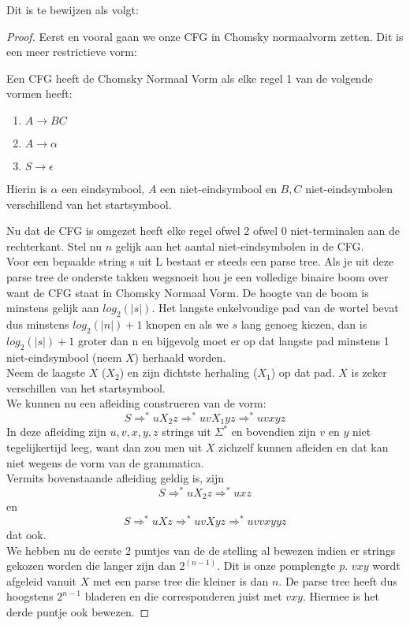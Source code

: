 Dit is te bewijzen als volgt:
\begin{proof}
Eerst en vooral gaan we onze CFG in Chomsky normaalvorm zetten. Dit is een meer restrictieve vorm:
\begin{theorem}
Een CFG heeft de Chomsky Normaal Vorm als elke regel 1 van de volgende vormen heeft:
\begin{enumerate}
\item $A \rightarrow BC$
\item $A \rightarrow \alpha$
\item $S \rightarrow \epsilon$
\end{enumerate}
Hierin is $\alpha$ een eindsymbool, $A$ een niet-eindsymbool en $B,C$ niet-eindsymbolen verschillend van het startsymbool.
\end{theorem}
Nu dat de CFG is omgezet heeft elke regel ofwel 2 ofwel 0 niet-terminalen aan de rechterkant. Stel nu $n$ gelijk aan het aantal niet-eindsymbolen in de CFG.\\[0.5cm]

Voor een bepaalde string s uit L bestaat er steeds een parse tree. Als je uit deze parse tree de onderste takken wegsnoeit hou je een volledige binaire boom over want de CFG staat in Chomsky Normaal Vorm. De hoogte van de boom is minstens gelijk aan $log_2(|s|)$. Het langste enkelvoudige pad van de wortel bevat dus minstens $log_2(|n|)+1$ knopen en als we $s$ lang genoeg kiezen, dan is $log_2(|s|)+1$ groter dan n en bijgevolg moet er op dat langste pad minstens 1 niet-eindsymbool (neem $X$) herhaald worden.\\[0.5cm]

Neem de laagste $X$ ($X_2$) en zijn dichtste herhaling ($X_1$) op dat pad. $X$ is zeker verschillen van het startsymbool.\\
We kunnen nu een afleiding construeren van de vorm:
$$ S \Rightarrow^* u X_2 z \Rightarrow^* u v X_1 y z \Rightarrow^* uvxyz  $$
In deze afleiding zijn $u,v,x,y,z$ strings uit $\Sigma^*$ en bovendien zijn $v$ en $y$ niet tegelijkertijd leeg, want dan zou men uit $X$ zichzelf kunnen afleiden en dat kan niet wegens de vorm van de grammatica. \\[0.5cm]

Vermits bovenstaande afleiding geldig is, zijn
$$ S \Rightarrow^* u X_2 z \Rightarrow^* u x z  $$
en
$$ S \Rightarrow^* u X z \Rightarrow^* u v X y z \Rightarrow^* u v v x y y z  $$
dat ook. \\[0.5cm]

We hebben nu de eerste 2 puntjes van de de stelling al bewezen indien er strings gekozen worden die langer zijn dan $2^{(n-1)}$. Dit is onze pomplengte $p$. $vxy$ wordt afgeleid vanuit $X$ met een parse tree die kleiner is dan $n$. De parse tree heeft dus hoogstens $2^{n-1}$ bladeren en die corresponderen juist met $vxy$. Hiermee is het derde puntje ook bewezen.

\end{proof}

